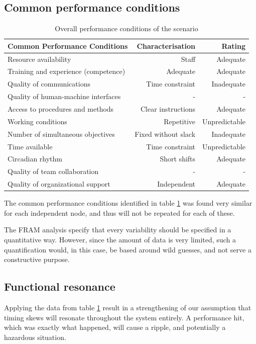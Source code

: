 \documentclass[10pt,oneside]{book}                  %
\begin{document}
\subsection{Common performance conditions}
\begin{table}[h]
\centering
    \begin{tabular}{ | l | r | r | }
    \hline
    Common Performance Conditions        & Characterisation & Rating \\ \hline \hline
    Resource availability                & Staff & Adequate \\ \hline
    Training and experience (competence) & Adequate & Adequate \\ \hline
    Quality of communications            & Time constraint     & Inadequate \\ \hline
    Quality of human-machine interfaces  & -                   & - \\ \hline
    Access to procedures and methods     & Clear instructions  & Adequate \\ \hline
    Working conditions                   & Repetitive          & Unpredictable \\ \hline
    Number of simultaneous objectives    & Fixed without slack & Inadequate \\ \hline
    Time available                       & Time constraint     & Unpredictable \\ \hline
    Circadian rhythm                     & Short shifts        & Adequate \\ \hline
    Quality of team collaboration        & -                   & - \\ \hline
    Quality of organizational support    & Independent         & Adequate \\ \hline
    \end{tabular}
\caption{Overall performance conditions of the scenario}
\label{table:working_conditions}
\end{table}
The common performance conditions identified in table \ref{table:working_conditions} was found very similar for each independent node, and thus will not be repeated for each of these.

The FRAM analysis specify that every variability should be specified in a quantitative way. However, since the amount of data is very limited, such a quantification would, in this case, be based around wild guesses, and not serve a constructive purpose.

\subsection{Functional resonance}
Applying the data from table \ref{table:working_conditions} result in a strengthening of our assumption that timing skews will resonate throughout the system entirely. A performance hit, which was exactly what happened, will cause a ripple, and potentially a hazardous situation.
\end{document}
